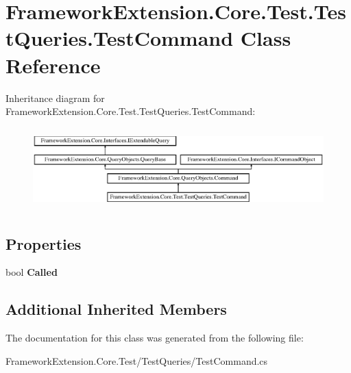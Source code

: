 \hypertarget{class_framework_extension_1_1_core_1_1_test_1_1_test_queries_1_1_test_command}{\section{Framework\-Extension.\-Core.\-Test.\-Test\-Queries.\-Test\-Command Class Reference}
\label{class_framework_extension_1_1_core_1_1_test_1_1_test_queries_1_1_test_command}
}
Inheritance diagram for Framework\-Extension.\-Core.\-Test.\-Test\-Queries.\-Test\-Command\-:\begin{figure}[H]
\begin{center}
\leavevmode
\includegraphics[height=3.200000cm]{class_framework_extension_1_1_core_1_1_test_1_1_test_queries_1_1_test_command}
\end{center}
\end{figure}
\subsection*{Properties}
\begin{DoxyCompactItemize}
\item 
\hypertarget{class_framework_extension_1_1_core_1_1_test_1_1_test_queries_1_1_test_command_aeb5c699821557093271e2a1184bd390a}{bool {\bfseries Called}}\label{class_framework_extension_1_1_core_1_1_test_1_1_test_queries_1_1_test_command_aeb5c699821557093271e2a1184bd390a}

\end{DoxyCompactItemize}
\subsection*{Additional Inherited Members}


The documentation for this class was generated from the following file\-:\begin{DoxyCompactItemize}
\item 
Framework\-Extension.\-Core.\-Test/\-Test\-Queries/Test\-Command.\-cs\end{DoxyCompactItemize}
